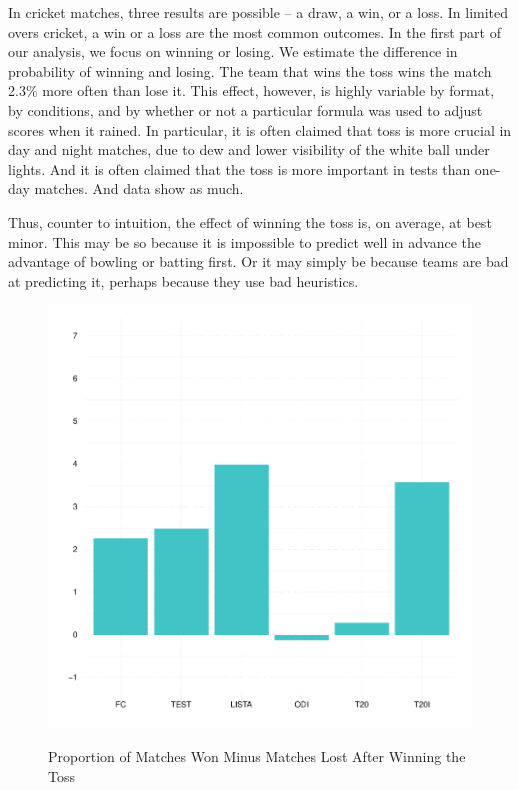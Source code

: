 \documentclass[11pt]{article}
\begin{document}
In cricket matches, three results are possible -- a draw, a win, or a loss. In limited overs cricket, a win or a loss are the most common outcomes. In the first part of our analysis, we focus on winning or losing. We estimate the difference in probability of winning and losing. The team that wins the toss wins the match 2.3\% more often than lose it. This effect, however, is highly variable by format, by conditions, and by whether or not a particular formula was used to adjust scores when it rained. In particular, it is often claimed that toss is more crucial in day and night matches, due to dew and lower visibility of the white ball under lights. And it is often claimed that the toss is more important in tests than one-day matches. And data show as much. 

Thus, counter to intuition, the effect of winning the toss is, on average, at best minor. This may be so because it is impossible to predict well in advance the advantage of bowling or batting first. Or it may simply be because teams are bad at predicting it, perhaps because they use bad heuristics.

\begin{figure}[htbp]
\centering
\caption{Proportion of Matches Won Minus Matches Lost After Winning the Toss}
\includegraphics[scale=.75]{../figs/winbyType.pdf}
\label{fig:summary}
\end{figure}
\end{document}
